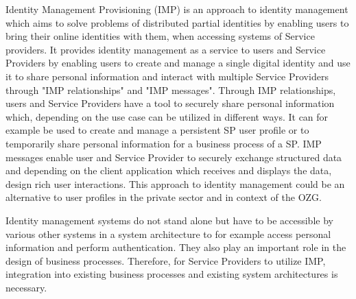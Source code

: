 Identity Management Provisioning (IMP) is an approach to identity management which aims to solve problems of distributed partial identities by enabling users to bring their online identities with them, when accessing systems of Service providers. It provides identity management as a service to users and Service Providers by enabling users to create and manage a single digital identity and use it to share personal information and interact with multiple Service Providers through "IMP relationships" and "IMP messages". Through IMP relationships, users and Service Providers have a tool to securely share personal information which, depending on the use case can be utilized in different ways. It can for example be used to create and manage a persistent SP user profile or to temporarily share personal information for a business process of a SP. IMP messages enable user and Service Provider to securely exchange structured data and depending on the client application which receives and displays the data, design rich user interactions. This approach to identity management could be an alternative to user profiles in the private sector and in context of the OZG.

Identity management systems do not stand alone but have to be accessible by various other systems in a system architecture to for example access personal information and perform authentication. They also play an important role in the design of business processes. Therefore, for Service Providers to utilize IMP, integration into existing business processes and existing system architectures is necessary.

